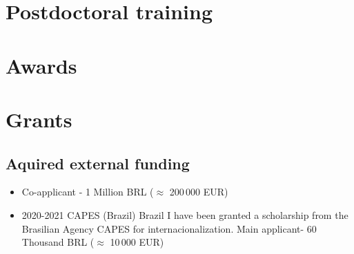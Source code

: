 \documentclass[10pt,A4]{article} %
\begin{document}
\section{Postdoctoral training} %

  

\section{Awards}

  

\section{Grants}
\subsection{Aquired external funding}

\begin{itemize}
\item {} {\small Co-applicant - 1 Million BRL ($\approx$ 200\,000 EUR)}

    \item {}
    { 2020-2021 }
    { CAPES (Brazil) }
    { Brazil }
    { I have been granted a scholarship from the Brasilian Agency CAPES for internacionalization. } {\small Main applicant-  60 Thousand BRL ($\approx$ 10\,000 EUR) }
  \end{itemize}
\end{document}
